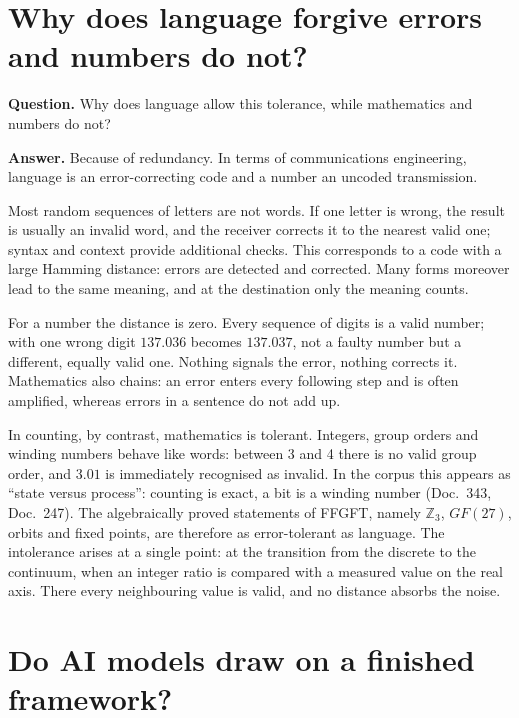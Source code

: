 \section{Why does language forgive errors and numbers do not?}

\textbf{Question.} Why does language allow this tolerance, while mathematics and numbers do not?

\textbf{Answer.} Because of redundancy. In terms of communications engineering, language is an
error-correcting code and a number an uncoded transmission.

Most random sequences of letters are not words. If one letter is wrong, the result is usually an
invalid word, and the receiver corrects it to the nearest valid one; syntax and context provide
additional checks. This corresponds to a code with a large Hamming distance: errors are detected and
corrected. Many forms moreover lead to the same meaning, and at the destination only the meaning
counts.

For a number the distance is zero. Every sequence of digits is a valid number; with one wrong digit
$137.036$ becomes $137.037$, not a faulty number but a different, equally valid one. Nothing signals
the error, nothing corrects it. Mathematics also chains: an error enters every following step and is
often amplified, whereas errors in a sentence do not add up.

In counting, by contrast, mathematics is tolerant. Integers, group orders and winding numbers behave
like words: between 3 and 4 there is no valid group order, and $3.01$ is immediately recognised as
invalid. In the corpus this appears as \enquote{state versus process}: counting is exact, a bit is a
winding number (Doc.~343, Doc.~247). The algebraically proved statements of FFGFT, namely
$\mathbb Z_3$, $GF(27)$, orbits and fixed points, are therefore as error-tolerant as language. The
intolerance arises at a single point: at the transition from the discrete to the continuum, when an
integer ratio is compared with a measured value on the real axis. There every neighbouring value is
valid, and no distance absorbs the noise.

\section{Do AI models draw on a finished framework?}

